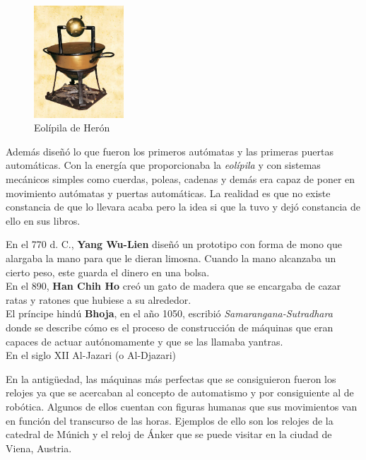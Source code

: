 \begin{figure}[H]
\begin{center}
  \includegraphics[width=0.3\textwidth]{./EtapaPrimeriza/imagenes/mv.jpg}
  \caption{Eolípila de Herón}
  \label{mv}
\end{center}
\end{figure}

Además diseñó lo que fueron los primeros autómatas y las primeras puertas automáticas. Con la energía que proporcionaba la \textit{eolípila} y con sistemas mecánicos simples como cuerdas, poleas, cadenas y demás era capaz de poner en movimiento autómatas y puertas automáticas. La realidad es que no existe constancia de que lo llevara acaba pero la idea si que la tuvo y dejó constancia de ello en sus libros.


En el 770 d. C., \textbf{Yang Wu-Lien } diseñó un prototipo con forma de mono que alargaba la mano para que le dieran limosna. Cuando la mano alcanzaba un cierto peso, este guarda el dinero en una bolsa.\\



En el 890, \textbf{Han Chih Ho} creó un gato de madera que se encargaba de cazar ratas y ratones que hubiese a su alrededor.\\

El príncipe hindú \textbf{Bhoja}, en el año 1050, escribió \textit{Samarangana-Sutradhara} donde se describe cómo es el proceso de construcción de máquinas que eran capaces de actuar autónomamente y que se las llamaba yantras.\\

En el siglo XII Al-Jazari (o Al-Djazari)

En la antigüedad, las máquinas más perfectas que se consiguieron fueron los relojes ya que se acercaban al concepto de automatismo y por consiguiente al de robótica. Algunos de ellos cuentan con figuras humanas que sus movimientos van en función del transcurso de las horas. Ejemplos de ello son los relojes de la catedral de Múnich y el reloj de Ánker que se puede visitar en la ciudad de Viena, Austria.

